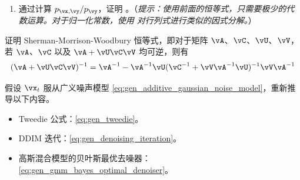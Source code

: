 \documentclass[../../book-main_zh.tex]{subfiles}
\begin{document}
\begin{exercise}
\begin{enumerate}
\begin{align}
            \end{align}
            其中 $\vm = (\vmu_{\vx} +
                \vSigma_{\vx\vy}\vSigma_{\vy}^{-1}(\vy
                - \vmu_{\vy})$。
            \item 通过计算 $p_{\vx, \vy} / p_{\vy}$，证明 。（\textit{提示：使用前面的恒等式，只需要极少的代数运算。对于归一化常数，使用  对行列式进行类似的因式分解。}）

        \end{enumerate}

    \end{exercise}

    \begin{exercise}\label{exercise:sherman_morrison_woodbury_identity}
        证明 Sherman-Morrison-Woodbury 恒等式，即对于矩阵 \(\vA\)、\(\vC\)、\(\vU\)、\(\vV\)，若 \(\vA\)、\(\vC\) 以及 \(\vA + \vU\vC\vV\) 均可逆，则有
        \begin{equation}
            (\vA + \vU\vC\vV)^{-1} = \vA^{-1} - \vA^{-1}\vU(\vC^{-1} +
            \vV\vA^{-1}\vU)^{-1}\vV\vA^{-1}
        \end{equation}
    \end{exercise}

    \begin{exercise}\label{exercise:generalizing_results_to_different_noise_models}
        假设 \(\vx_{t}\) 服从广义噪声模型 \eqref{eq:gen_additive_gaussian_noise_model}，重新推导以下内容。
        \begin{itemize}
            \item Tweedie 公式：\eqref{eq:gen_tweedie}。
            \item DDIM 迭代：\eqref{eq:gen_denoising_iteration}。
            \item 高斯混合模型的贝叶斯最优去噪器：\eqref{eq:gen_gmm_bayes_optimal_denoiser}。
        \end{itemize}
    \end{exercise}
\end{document}
